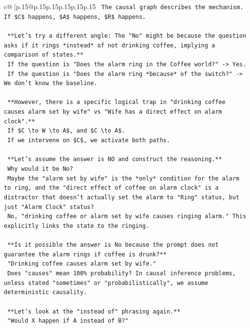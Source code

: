\documentclass{article}
\begin{document}
{\begin{supertabular}{c@{$\;$}|p{.15\linewidth}@{}p{.15\linewidth}p{.15\linewidth}p{.15\linewidth}p{.15\linewidth}p{.15\linewidth}}
{{{\texttt{        The causal graph describes the mechanism. If \$C\$ happens, \$A\$ happens, \$R\$ happens.} \\
\\ 
\texttt{        **Let's try a different angle: The "No" might be because the question asks if it rings *instead* of not drinking coffee, implying a comparison of states.**} \\
\texttt{        If the question is "Does the alarm ring in the Coffee world?" {-}> Yes.} \\
\texttt{        If the question is "Does the alarm ring *because* of the switch?" {-}> We don't know the baseline.} \\
\\ 
\texttt{        **However, there is a specific logical trap in "drinking coffee causes alarm set by wife" vs "Wife has a direct effect on alarm clock".**} \\
\texttt{        If \$C \textbackslash{}to W \textbackslash{}to A\$, and \$C \textbackslash{}to A\$.} \\
\texttt{        If we intervene on \$C\$, we activate both paths.} \\
\\ 
\texttt{        **Let's assume the answer is NO and construct the reasoning.**} \\
\texttt{        Why would it be No?} \\
\texttt{        Maybe the "alarm set by wife" is the *only* condition for the alarm to ring, and the "direct effect of coffee on alarm clock" is a distractor that doesn't actually set the alarm to "Ring" status, but just "Alarm Clock" status?} \\
\texttt{        No, "drinking coffee or alarm set by wife causes ringing alarm." This explicitly links the state to the ringing.} \\
\\ 
\texttt{        **Is it possible the answer is No because the prompt does not guarantee the alarm rings if coffee is drunk?**} \\
\texttt{        "Drinking coffee causes alarm set by wife."} \\
\texttt{        Does "causes" mean 100\% probability? In causal inference problems, unless stated "sometimes" or "probabilistically", we assume deterministic causality.} \\
\\ 
\texttt{        **Let's look at the "instead of" phrasing again.**} \\
\texttt{        "Would X happen if A instead of B?"} \\
}}}
\end{supertabular}}
\end{document}
